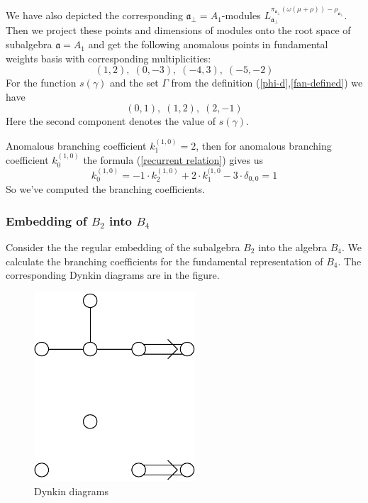 \documentclass[a4paper,12pt]{article}
\theoremstyle{definition} \newtheorem{Def}{Definition}
\begin{document}
We have also depicted the corresponding $\mathfrak{a}_{\bot}=A_1$-modules $L^{\pi_{\mathfrak{a}_{\bot}}(\omega(\mu+\rho))-\rho_{\mathfrak{a}_{\bot}}}_{\mathfrak{a}_{\bot}}$.
Then we project these points and dimensions of modules onto the root space of subalgebra $\mathfrak{a}=A_1$ and get the following anomalous points in fundamental weights basis with corresponding multiplicities:
\begin{equation}
  \label{eq:25}
  (1,2),\; (0,-3),\; (-4,3),\; (-5,-2)
\end{equation}
For the function $s(\gamma)$ and the set $\Gamma$ from the definition (\ref{phi-d},\ref{fan-defined}) we have
\begin{equation}
  \label{eq:22}
  (0,1),\; (1,2),\; (2,-1)
\end{equation}
Here the second component denotes the value of $s(\gamma)$.

Anomalous branching coefficient $k^{(1,0)}_{1}=2$, then for anomalous branching coefficient $k^{(1,0)}_{0}$ the formula (\ref{recurrent relation}) gives us
\begin{equation}
  \label{eq:23}
  k^{(1,0)}_{0}=-1\cdot k^{(1,0)}_2 +2\cdot k^{(1,0}_1 - 3\cdot \delta_{0,0} = 1
\end{equation}
So we've computed the branching coefficients.
\subsubsection{Embedding of $B_2$ into $B_4$}
\label{sec:someth-high-dimens}
Consider the the regular embedding of the subalgebra $B_2$ into the algebra $B_4$.
We calculate the branching coefficients for the fundamental representation of $B_4$.
The corresponding Dynkin diagrams are in the figure.
\begin{figure}[ph]
  \centering
  \includegraphics[width=60mm]{B4_B2_2A1.pdf}
  \caption{Dynkin diagrams}
  \label{fig:dynkin}
\end{figure}
\end{document}
